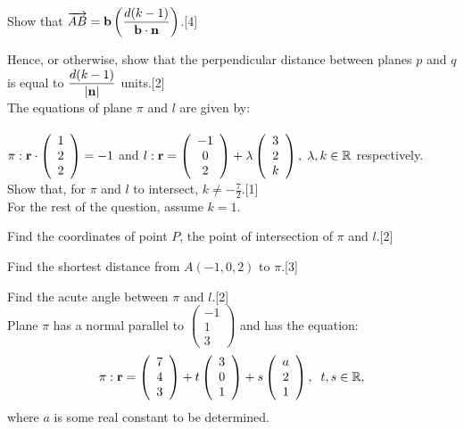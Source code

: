\documentclass[12pt, a4 paper]{article}
\begin{document}
\begin{outline}[enumerate]
	\2 Show that $\overrightarrow {AB}  = {\bf{b}}\left( {\dfrac{{d(k - 1)}}{{{\bf{b}} \cdot {\bf{n}}}}} \right)$.\hfill[4]

	\2 Hence, or otherwise, show that the perpendicular distance between planes $p$ and $q$ is equal to $\dfrac{{d(k - 1)}}{{\left| {\bf{n}} \right|}}$ units.\hfill[2]\\

	\1 The equations of plane $\pi $ and $l$ are given by:\\\\
	$\pi :{\bf{r}} \cdot \left( {\begin{array}{*{20}{c}}1\\2\\2\end{array}} \right) =  - 1$ and $l:{\bf{r}} = \left( {\begin{array}{*{20}{c}}{ - 1}\\0\\2\end{array}} \right) + \lambda \left( {\begin{array}{*{20}{c}}3\\2\\k\end{array}} \right),\;\lambda ,k \in \mathbb{R}$ respectively.\\

	\2 Show that, for $\pi $ and $l$ to intersect, $k \ne  - \frac{7}{2}$.\hfill[1]\\

	For the rest of the question, assume $k = 1$.

	\2 Find the coordinates of point $P$, the point of intersection of $\pi $ and $l$.\hfill[2]

	\2 Find the shortest distance from $A( - 1,0,2)$ to $\pi $.\hfill[3]

	\2 Find the acute angle between $\pi $ and $l$.\hfill[2]\\

	\1 Plane $\pi $ has a normal parallel to $\left( {\begin{array}{*{20}{c}}{ - 1}\\1\\3\end{array}} \right)$ and has the equation:
	\begin{align*}
		\pi :{\bf{r}} = \left( {\begin{array}{*{20}{c}}7 \\4\\3\end{array}} \right) + t\left( {\begin{array}{*{20}{c}}3\\0\\1\end{array}} \right) + s\left( {\begin{array}{*{20}{c}}a\\2\\1\end{array}} \right),\;\;t,s \in \mathbb{R},
	\end{align*}
	where $a$ is some real constant to be determined.


\end{outline}
\end{document}
